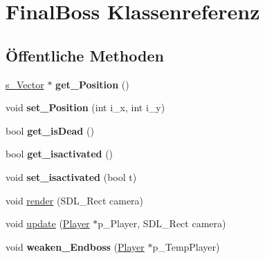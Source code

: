 \hypertarget{class_final_boss}{\section{Final\-Boss Klassenreferenz}
\label{class_final_boss}
}
\subsection*{Öffentliche Methoden}
\begin{DoxyCompactItemize}
\item 
\hypertarget{class_final_boss_a6c30600b7492a40d2ec99874d41296b0}{\hyperlink{structs___vector}{s\-\_\-\-Vector} $\ast$ {\bfseries get\-\_\-\-Position} ()}\label{class_final_boss_a6c30600b7492a40d2ec99874d41296b0}

\item 
\hypertarget{class_final_boss_a65029b764ec03a87caf71e7687d23306}{void {\bfseries set\-\_\-\-Position} (int i\-\_\-x, int i\-\_\-y)}\label{class_final_boss_a65029b764ec03a87caf71e7687d23306}

\item 
\hypertarget{class_final_boss_abacad04a4ff64dd94b3338b7cab122f2}{bool {\bfseries get\-\_\-is\-Dead} ()}\label{class_final_boss_abacad04a4ff64dd94b3338b7cab122f2}

\item 
\hypertarget{class_final_boss_aa0baaf57ed8bacb2174fbcc65b75cec9}{bool {\bfseries get\-\_\-isactivated} ()}\label{class_final_boss_aa0baaf57ed8bacb2174fbcc65b75cec9}

\item 
\hypertarget{class_final_boss_aa9ee8f4ddea7ecfc2d7b9bbaf6ca73a6}{void {\bfseries set\-\_\-isactivated} (bool t)}\label{class_final_boss_aa9ee8f4ddea7ecfc2d7b9bbaf6ca73a6}

\item 
void \hyperlink{class_final_boss_a0dfe88f2e430bd3a8760801809ab7c01}{render} (S\-D\-L\-\_\-\-Rect camera)
\item 
void \hyperlink{class_final_boss_a201e58c54ae09fbfd97bf6ef4fb2843f}{update} (\hyperlink{class_player}{Player} $\ast$p\-\_\-\-Player, S\-D\-L\-\_\-\-Rect camera)
\item 
\hypertarget{class_final_boss_a1579fd9da81da66bbed75799f7113be9}{void {\bfseries weaken\-\_\-\-Endboss} (\hyperlink{class_player}{Player} $\ast$p\-\_\-\-Temp\-Player)}\label{class_final_boss_a1579fd9da81da66bbed75799f7113be9}

\end{DoxyCompactItemize}


